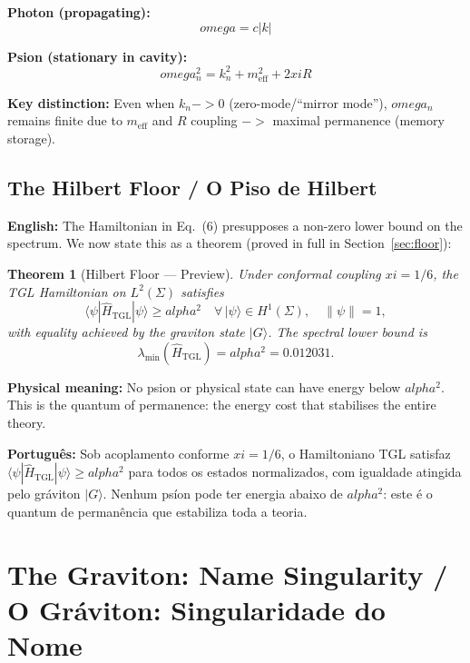 \documentclass[12pt,a4paper]{article}
\newtheorem{theorem}{Theorem}
\def\to{ -> }%
\def\alpha{alpha}%
\def\xi{xi}%
\def\omega{omega}%
\begin{document}
\textbf{Photon (propagating):}
\begin{equation}
\omega = c|k|
\end{equation}

\textbf{Psion (stationary in cavity):}
\begin{equation}
\omega_n^2 = k_n^2 + m_{\text{eff}}^2 + 2\xi R
\end{equation}

\textbf{Key distinction:} Even when $k_n \to 0$ (zero-mode/``mirror mode''), $\omega_n$ remains finite due to $m_{\text{eff}}$ and $R$ coupling $\to$ maximal permanence (memory storage).

\subsection{The Hilbert Floor / O Piso de Hilbert}
\label{subsec:floor_preview}

\textbf{English:} The Hamiltonian in Eq.~(6) presupposes a non-zero lower bound on the spectrum. We now state this as a theorem (proved in full in Section~\ref{sec:floor}):

\begin{theorem}[Hilbert Floor --- Preview]
\label{thm:floor_preview}
Under conformal coupling $\xi = 1/6$, the TGL Hamiltonian on $L^2(\Sigma)$ satisfies
\begin{equation}
\langle\psi|\hat{H}_{\text{TGL}}|\psi\rangle \geq \alpha^2 \quad \forall\,|\psi\rangle \in H^1(\Sigma),\quad \|\psi\| = 1,
\end{equation}
with equality achieved by the graviton state $|G\rangle$. The spectral lower bound is
\begin{equation}
\lambda_{\min}(\hat{H}_{\text{TGL}}) = \alpha^2 = 0.012031.
\end{equation}
\end{theorem}

\textbf{Physical meaning:} No psion or physical state can have energy below $\alpha^2$. This is the quantum of permanence: the energy cost that stabilises the entire theory.

\textbf{Português:} Sob acoplamento conforme $\xi = 1/6$, o Hamiltoniano TGL satisfaz $\langle\psi|\hat{H}_{\text{TGL}}|\psi\rangle \geq \alpha^2$ para todos os estados normalizados, com igualdade atingida pelo gráviton $|G\rangle$. Nenhum psíon pode ter energia abaixo de $\alpha^2$: este é o quantum de permanência que estabiliza toda a teoria.

\section{The Graviton: Name Singularity / O Gráviton: Singularidade do Nome}
\end{document}
